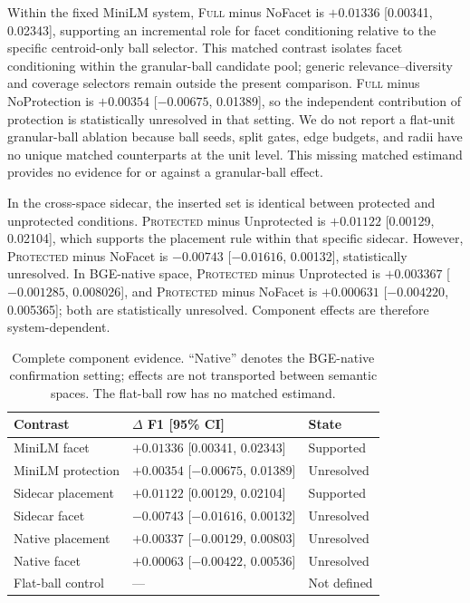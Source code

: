 \documentclass[11pt]{article}
\newcommand{\full}{\textsc{Full}\xspace}
\newcommand{\prot}{\textsc{Protected}\xspace}
\begin{document}
Within the fixed MiniLM system, \full minus NoFacet is
$+0.01336$ [0.00341, 0.02343], supporting an incremental role for facet
conditioning relative to the specific centroid-only ball selector. This
matched contrast isolates facet conditioning within the granular-ball
candidate pool; generic relevance--diversity and coverage selectors remain
outside the present comparison. \full minus NoProtection is $+0.00354$
[$-0.00675$, 0.01389], so the independent contribution of protection is
statistically unresolved in that setting. We do not report a flat-unit
granular-ball ablation because ball seeds, split gates, edge budgets, and radii
have no unique matched counterparts at the unit level. This missing matched
estimand provides no evidence for or against a granular-ball effect.

In the cross-space sidecar, the inserted set is identical between protected
and unprotected conditions. \prot minus Unprotected is
$+0.01122$ [0.00129, 0.02104], which supports the placement rule within that
specific sidecar. However, \prot minus NoFacet is
$-0.00743$ [$-0.01616$, 0.00132], statistically unresolved. In BGE-native space,
\prot minus Unprotected is $+0.003367$ [$-0.001285$, 0.008026], and
\prot minus NoFacet is $+0.000631$ [$-0.004220$, 0.005365]; both are
statistically unresolved. Component effects are therefore system-dependent.

\begin{table}[t]
\centering
\scriptsize
\setlength{\tabcolsep}{2.2pt}
\begin{tabular}{@{}lll@{}}
\toprule
Contrast & $\Delta$ F1 [95\% CI] & State \\
\midrule
MiniLM facet & $+0.01336$ [0.00341, 0.02343] & Supported \\
MiniLM protection & $+0.00354$ [$-0.00675$, 0.01389] & Unresolved \\
Sidecar placement & $+0.01122$ [0.00129, 0.02104] & Supported \\
Sidecar facet & $-0.00743$ [$-0.01616$, 0.00132] & Unresolved \\
Native placement & $+0.00337$ [$-0.00129$, 0.00803] & Unresolved \\
Native facet & $+0.00063$ [$-0.00422$, 0.00536] & Unresolved \\
Flat-ball control & --- & Not defined \\
\bottomrule
\end{tabular}
\caption{Complete component evidence. ``Native'' denotes the BGE-native
confirmation setting; effects are not transported between semantic spaces.
The flat-ball row has no matched estimand.}
\label{tab:components}
\end{table}
\end{document}
